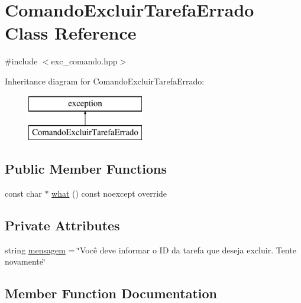 \hypertarget{classComandoExcluirTarefaErrado}{}\section{Comando\+Excluir\+Tarefa\+Errado Class Reference}
\label{classComandoExcluirTarefaErrado}


{\ttfamily \#include $<$exc\+\_\+comando.\+hpp$>$}

Inheritance diagram for Comando\+Excluir\+Tarefa\+Errado\+:\begin{figure}[H]
\begin{center}
\leavevmode
\includegraphics[height=2.000000cm]{classComandoExcluirTarefaErrado}
\end{center}
\end{figure}
\subsection*{Public Member Functions}
\begin{DoxyCompactItemize}
\item 
const char $\ast$ \hyperlink{classComandoExcluirTarefaErrado_a0e01ae298b6026f2497055d82f5b868f}{what} () const noexcept override
\end{DoxyCompactItemize}
\subsection*{Private Attributes}
\begin{DoxyCompactItemize}
\item 
string \hyperlink{classComandoExcluirTarefaErrado_a0223bc12d367ca404bab4ec1f5a084cf}{mensagem} = \char`\"{}Você deve informar o ID da tarefa que deseja excluir. Tente novamente\char`\"{}
\end{DoxyCompactItemize}


\subsection{Member Function Documentation}
\mbox{\label{classComandoExcluirTarefaErrado_a0e01ae298b6026f2497055d82f5b868f}} 
